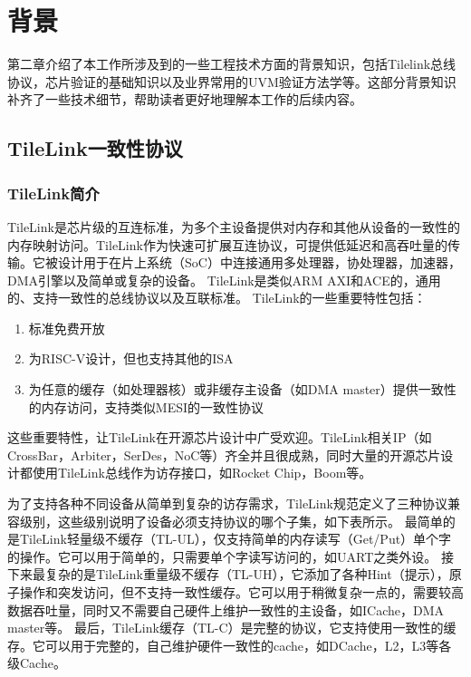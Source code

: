 \chapter{背景}\label{chap:background}

第二章介绍了本工作所涉及到的一些工程技术方面的背景知识，包括Tilelink总线协议，芯片验证的基础知识以及业界常用的UVM验证方法学等。这部分背景知识补齐了一些技术细节，帮助读者更好地理解本工作的后续内容。

\section{TileLink一致性协议}

\subsection{TileLink简介}

TileLink是芯片级的互连标准，为多个主设备提供对内存和其他从设备的一致性的内存映射访问。TileLink作为快速可扩展互连协议，可提供低延迟和高吞吐量的传输。它被设计用于在片上系统（SoC）中连接通用多处理器，协处理器，加速器，DMA引擎以及简单或复杂的设备。
TileLink是类似ARM AXI和ACE的，通用的、支持一致性的总线协议以及互联标准。
TileLink的一些重要特性包括：
\begin{enumerate}
	\item 标准免费开放
	\item 为RISC-V设计，但也支持其他的ISA
	\item 为任意的缓存（如处理器核）或非缓存主设备（如DMA master）提供一致性的内存访问，支持类似MESI的一致性协议
\end{enumerate}

这些重要特性，让TileLink在开源芯片设计中广受欢迎。TileLink相关IP（如CrossBar，Arbiter，SerDes，NoC等）齐全并且很成熟，同时大量的开源芯片设计都使用TileLink总线作为访存接口，如Rocket Chip，Boom等。

为了支持各种不同设备从简单到复杂的访存需求，TileLink规范定义了三种协议兼容级别，这些级别说明了设备必须支持协议的哪个子集，如下表所示。
最简单的是TileLink轻量级不缓存（TL-UL），仅支持简单的内存读写（Get/Put）单个字的操作。它可以用于简单的，只需要单个字读写访问的，如UART之类外设。
接下来最复杂的是TileLink重量级不缓存（TL-UH），它添加了各种Hint（提示），原子操作和突发访问，但不支持一致性缓存。它可以用于稍微复杂一点的，需要较高数据吞吐量，同时又不需要自己硬件上维护一致性的主设备，如ICache，DMA master等。
最后，TileLink缓存（TL-C）是完整的协议，它支持使用一致性的缓存。它可以用于完整的，自己维护硬件一致性的cache，如DCache，L2，L3等各级Cache。

